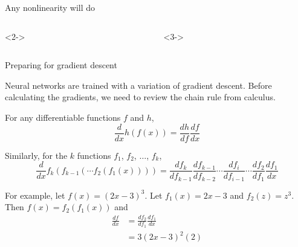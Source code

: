 \documentclass[9pt]{beamer}
\begin{document}
\begin{frame}{Any nonlinearity will do}
\begin{columns}[T]
\pause
\begin{column}{0.3\textwidth}<2->
	\begin{center}
	\end{center}
\end{column}

\pause
\begin{column}{0.3\textwidth}<3->
	\begin{center}
	\end{center}
\end{column}

\end{columns}	
\end{frame}

\begin{frame}{Preparing for gradient descent}

Neural networks are trained with a variation of gradient descent. Before calculating the gradients, we need to review the chain rule from calculus.

\bigskip
\pause
For any differentiable functions $f$ and $h$,
\[ \frac{d}{dx}h(f(x)) = \frac{dh}{df}\frac{df}{dx} \]

\pause
Similarly, for the $k$ functions $f_1$, $f_2$, $\ldots$, $f_k$,
\[ \frac{d}{dx}f_k(f_{k-1}(\cdots f_2(f_1(x)))) = \frac{df_k}{df_{k-1}} \frac{df_{k-1}}{df_{k-2}}\cdots \frac{df_i}{df_{i-1}}\cdots \frac{df_2}{df_1}\frac{df_1}{dx} \]

\pause
For example, let $f(x) = (2x-3)^3$. Let $f_1(x) = 2x-3$ and $f_2(z) = z^3$. Then $f(x) = f_2(f_1(x))$ and
\begin{align*}
	\frac{df}{dx} &= \frac{df_2}{df_1}\frac{df_1}{dx} \\
		&= 3(2x-3)^2(2)
\end{align*}
\end{frame}
\end{document}
